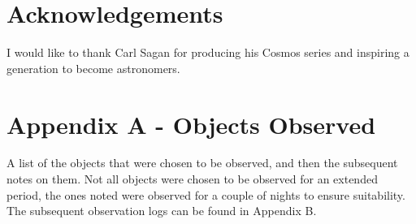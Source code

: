 \documentclass[twocolumn]{revtex4}
\begin{document}
\vspace{-5ex}
\section*{Acknowledgements}
\vspace{-2ex}

I would like to thank Carl Sagan for producing his Cosmos series and inspiring a generation to become astronomers.





\clearpage
\onecolumngrid
\vspace{-3ex}
\section*{Appendix A - Objects Observed}
\vspace{-2ex}
A list of the objects that were chosen to be observed, and then the subsequent notes on them. Not all objects were chosen to be observed for an extended period, the ones noted were observed for a couple of nights to ensure suitability. The subsequent observation logs can be found in Appendix B.
\end{document}
